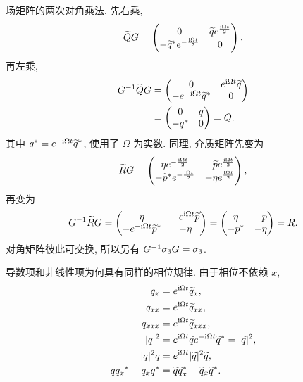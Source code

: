 \par\smallskip\noindent 场矩阵的两次对角乘法.\quad
先右乘,
\begin{equation*}
\widetilde QG=
\begin{pmatrix}
0&\widetilde q e^{\frac{\mathrm{i}\Omega t}{2}}\\
-{\widetilde q}^{*}e^{-\frac{\mathrm{i}\Omega t}{2}}&0
\end{pmatrix},
\end{equation*}
再左乘,
\begin{align*}
G^{-1}\widetilde QG
&=\begin{pmatrix}
0&e^{\mathrm{i}\Omega t}\widetilde q\\
-e^{-\mathrm{i}\Omega t}{\widetilde q}^{*}&0
\end{pmatrix}\\
&=\begin{pmatrix}0&q\\-{q}^{*}&0\end{pmatrix}=Q.
\end{align*}
其中 ${q}^{*}=e^{-\mathrm{i}\Omega t}{\widetilde q}^{*}$, 使用了 $\Omega$ 为实数. 同理, 介质矩阵先变为
\begin{equation*}
\widetilde RG=
\begin{pmatrix}
\eta e^{-\frac{\mathrm{i}\Omega t}{2}}
&-\widetilde p e^{\frac{\mathrm{i}\Omega t}{2}}\\
-{\widetilde p}^{*}e^{-\frac{\mathrm{i}\Omega t}{2}}
&-\eta e^{\frac{\mathrm{i}\Omega t}{2}}
\end{pmatrix},
\end{equation*}
再变为
\begin{equation*}
G^{-1}\widetilde RG=
\begin{pmatrix}
\eta&-e^{\mathrm{i}\Omega t}\widetilde p\\
-e^{-\mathrm{i}\Omega t}{\widetilde p}^{*}&-\eta
\end{pmatrix}
=\begin{pmatrix}\eta&-p\\-{p}^{*}&-\eta\end{pmatrix}=R.
\end{equation*}
对角矩阵彼此可交换, 所以另有 $G^{-1}\sigma_3 G=\sigma_3$.
\par\smallskip\noindent 导数项和非线性项为何具有同样的相位规律.\quad
由于相位不依赖 $x$,
\begin{align*}
q_x&=e^{\mathrm{i}\Omega t}\widetilde q_x,\\
q_{xx}&=e^{\mathrm{i}\Omega t}\widetilde q_{xx},\\
q_{xxx}&=e^{\mathrm{i}\Omega t}\widetilde q_{xxx},\\
|q|^2&=e^{\mathrm{i}\Omega t}\widetilde q
e^{-\mathrm{i}\Omega t}{\widetilde q}^{*}
=|\widetilde q|^2,\\
|q|^2q&=e^{\mathrm{i}\Omega t}|\widetilde q|^2\widetilde q,\\
q{q_x}^{*}-q_x{q}^{*}
&=\widetilde q{\widetilde q_x}^{*}
-\widetilde q_x{\widetilde q}^{*}.
\end{align*}
